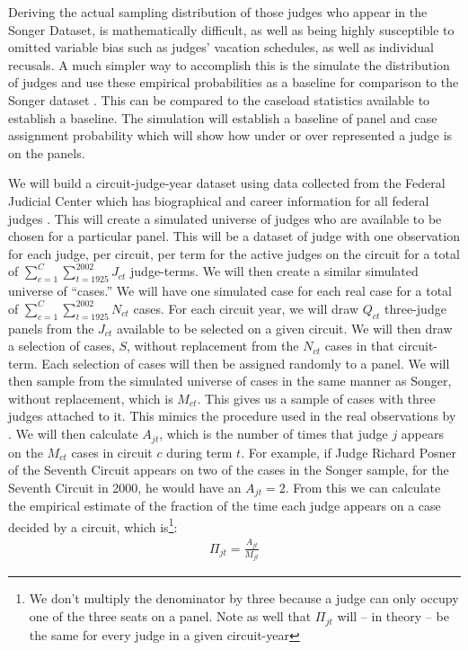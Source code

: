 \documentclass[12pt]{article}
\begin{document}
Deriving the actual sampling distribution of those judges who appear in the Songer Dataset, is mathematically difficult, as well as being highly susceptible to omitted variable bias such as judges' vacation schedules, as well as individual recusals.  A much simpler way to accomplish this is the simulate the distribution of judges and use these empirical probabilities as a baseline for comparison to the Songer dataset \citep{Songer2007}.  This can be compared to the caseload statistics available to establish a baseline. The simulation will establish a baseline of panel and case assignment probability which will show how under or over represented a judge is on the panels. 

We will build a circuit-judge-year dataset using data collected from the Federal Judicial Center which has biographical and career information for all federal judges \citep{FJC}.  This will create a simulated universe of judges who are available to be chosen for a particular panel.  This will be a dataset of judge  with one observation for each judge, per circuit, per term for the active judges on the circuit for a total of $\sum_{c=1}^{C}\sum_{t=1925}^{2002}J_{ct}$ judge-terms.  We will then create a similar simulated universe of ``cases.''  We will have one simulated case for each real case for a total of $\sum_{c=1}^{C}\sum_{t=1925}^{2002}N_{ct}$ cases.  For each circuit year, we will draw $Q_{ct}$ three-judge panels from the $J_{ct}$ available to be selected on a given circuit.  We will then draw a selection of cases, $S$, without replacement from the $N_{ct}$ cases in that circuit-term.  Each selection of cases will then be assigned randomly to a panel.  We will then sample from the simulated universe of cases in the same manner as Songer, without replacement, which is $M_{ct}$.  This gives us a sample of cases with three judges attached to it.  This mimics the procedure used in the real observations by \citet{Songer2007}.  We will then calculate $A_{jt}$, which is the number of times that judge $j$ appears on the $M_{ct}$ cases in circuit $c$ during term $t$.  For example, if Judge Richard Posner of the Seventh Circuit appears on two of the cases in the Songer sample, for the Seventh Circuit in 2000, he would have an $A_{jt}=2$.  From this we can calculate the empirical estimate of the fraction of the time each judge appears on a case decided by a circuit, which is\footnote{We don't multiply the denominator by three because a judge can only occupy one of the three seats on a panel. Note as well that $\Pi_{jt}$ will -- in theory -- be the same for every judge in a given circuit-year}:
\begin{align}\label{eq-probs}
\Pi_{jt}=\frac{A_{jt}}{M_{jt}}
\end{align}
\end{document}
